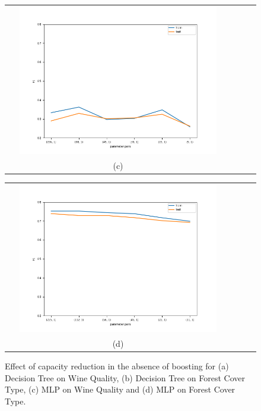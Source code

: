 \documentclass{article}
\begin{document}
\begin{figure}[H]\ContinuedFloat
    \begin{tabular}{cccc}
    \includegraphics[width=0.9\textwidth]{Results_MLP/mlp-wine-not-boosted_f1.png} \\
    (c)\\[6pt]
    \end{tabular}
    \begin{tabular}{cccc}
    \includegraphics[width=0.9\textwidth]{Results_MLP/mlp-covtype_balanced-not-boosted_f1.png} \\
    (d)\\[6pt]
    \end{tabular}
    \caption{Effect of capacity reduction in the absence of boosting for (a) Decision Tree on Wine Quality, (b) Decision Tree on Forest Cover Type, (c) MLP on Wine Quality and (d) MLP on Forest Cover Type.}
    \label{fig:MLP_results}
\end{figure}
\end{document}
